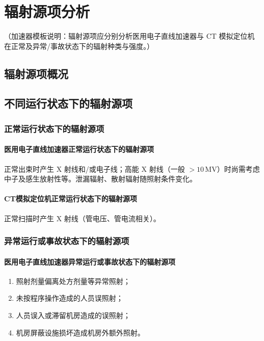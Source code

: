 \chapter{辐射源项分析}

（加速器模板说明：辐射源项应分别分析医用电子直线加速器与 CT 模拟定位机在正常及异常/事故状态下的辐射种类与强度。）

\section{辐射源项概况}



\section{不同运行状态下的辐射源项}

\subsection{正常运行状态下的辐射源项}

\subsubsection{医用电子直线加速器正常运行状态下的辐射源项}

正常出束时产生 X 射线和/或电子线；高能 X 射线（一般 $>10\,\mathrm{MV}$）时尚需考虑中子及感生放射性等。泄漏辐射、散射辐射随照射条件变化。

\subsubsection{CT模拟定位机正常运行状态下的辐射源项}

正常扫描时产生 X 射线（管电压、管电流相关）。

\subsection{异常运行或事故状态下的辐射源项}

\subsubsection{医用电子直线加速器异常运行或事故状态下的辐射源项}

\begin{enumerate}
\item 照射剂量偏离处方剂量等异常照射；
\item 未按程序操作造成的人员误照射；
\item 人员误入或滞留机房造成的误照射；
\item 机房屏蔽设施损坏造成机房外额外照射。
\end{enumerate}

